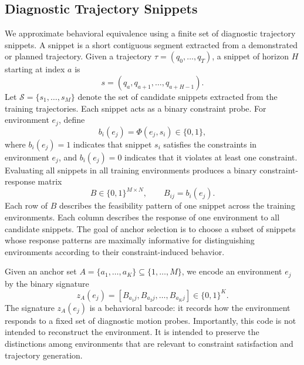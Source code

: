 \subsection{Diagnostic Trajectory Snippets}

We approximate behavioral equivalence using a finite set of diagnostic trajectory snippets. A snippet is a short contiguous segment extracted from a demonstrated or planned trajectory. Given a trajectory $\tau=(q_0,\ldots,q_T)$, a snippet of horizon $H$ starting at index $a$ is
%
\begin{equation}
    s = (q_a,q_{a+1},\ldots,q_{a+H-1}).
\end{equation}
%
Let $\mathcal{S}=\{s_1,\ldots,s_M\}$ denote the set of candidate snippets extracted from the training trajectories. Each snippet acts as a binary constraint probe. For environment $e_j$, define
%
\begin{equation}
    b_i(e_j) = \Phi(e_j,s_i) \in \{0,1\},
\end{equation}
%
where $b_i(e_j)=1$ indicates that snippet $s_i$ satisfies the constraints in environment $e_j$, and $b_i(e_j)=0$ indicates that it violates at least one constraint. Evaluating all snippets in all training environments produces a binary constraint-response matrix
%
\begin{equation}
    B\in\{0,1\}^{M\times N},
    \qquad
    B_{ij}=b_i(e_j).
\end{equation}
%
Each row of $B$ describes the feasibility pattern of one snippet across the training environments. Each column describes the response of one environment to all candidate snippets. The goal of anchor selection is to choose a subset of snippets whose response patterns are maximally informative for distinguishing environments according to their constraint-induced behavior.

Given an anchor set $A=\{a_1,\ldots,a_K\}\subseteq \{1,\ldots,M\}$, we encode an environment $e_j$ by the binary signature
%
\begin{equation}
    z_A(e_j)
    =
    \left[
        B_{a_1j},
        B_{a_2j},
        \ldots,
        B_{a_Kj}
    \right]
    \in\{0,1\}^{K}.
\end{equation}
%
The signature $z_A(e_j)$ is a behavioral barcode: it records how the environment responds to a fixed set of diagnostic motion probes. Importantly, this code is not intended to reconstruct the environment. It is intended to preserve the distinctions among environments that are relevant to constraint satisfaction and trajectory generation.

